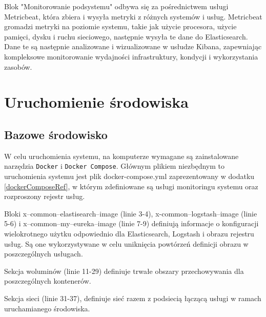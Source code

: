 Blok "Monitorowanie podsystemu" odbywa się za pośrednictwem usługi Metricbeat, która zbiera i wysyła metryki z różnych systemów i usług. Metricbeat gromadzi metryki na poziomie systemu, takie jak użycie procesora, użycie pamięci, dysku i ruchu sieciowego, następnie wysyła te dane do Elasticsearch. Dane te są następnie analizowane i wizualizowane w usłudze Kibana, zapewniając kompleksowe monitorowanie wydajności infrastruktury, kondycji i wykorzystania zasobów.

\section{Uruchomienie środowiska}

\subsection{Bazowe środowisko}

W celu uruchomienia systemu, na komputerze wymagane są zainstalowane narzędzia \verb|Docker| i \verb|Docker Compose|. Głównym plikiem niezbędnym to uruchomienia systemu jest plik docker-compose.yml zaprezentowany w dodatku \ref{dockerComposeRef}, w którym zdefiniowane są usługi monitoringu systemu oraz rozproszony rejestr usług.

Bloki x--common--elastisearch--image (linie 3-4), x-common--logstash--image (linie 5-6) i x--common--my--eureka--image (linie 7-9) definiują informacje o konfiguracji wielokrotnego użytku odpowiednio dla Elasticsearch, Logstash i obrazu rejestru usług. Są one wykorzystywane w celu uniknięcia powtórzeń definicji obrazu w poszczególnych usługach.

Sekcja woluminów (linie 11-29) definiuje trwałe obszary przechowywania dla poszczególnych kontenerów.

Sekcja sieci (linie 31-37), definiuje sieć razem z podsiecią łączącą usługi w ramach uruchamianego środowiska.

